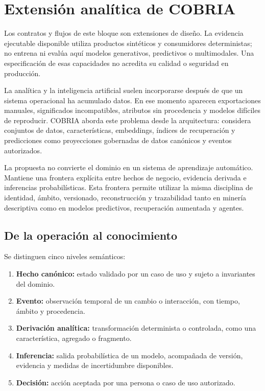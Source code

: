 \chapter{Extensión analítica de COBRIA}

Los contratos y flujos de este bloque son extensiones de diseño. La evidencia
ejecutable disponible utiliza productos sintéticos y consumidores deterministas;
no entrena ni evalúa aquí modelos generativos, predictivos o multimodales. Una
especificación de esas capacidades no acredita su calidad o seguridad en producción.

La analítica y la inteligencia artificial suelen incorporarse después de que un sistema
operacional ha acumulado datos. En ese momento aparecen exportaciones manuales,
significados incompatibles, atributos sin procedencia y modelos difíciles de reproducir.
COBRIA aborda este problema desde la arquitectura: considera conjuntos de datos, características,
embeddings, índices de recuperación y predicciones como proyecciones gobernadas de datos
canónicos y eventos autorizados.

La propuesta no convierte el dominio en un sistema de aprendizaje automático. Mantiene
una frontera explícita entre hechos de negocio, evidencia derivada e inferencias
probabilísticas. Esta frontera permite utilizar la misma disciplina de identidad, ámbito,
versionado, reconstrucción y trazabilidad tanto en minería descriptiva como en modelos
predictivos, recuperación aumentada y agentes.

\section{De la operación al conocimiento}

Se distinguen cinco niveles semánticos:

\begin{enumerate}[leftmargin=*]
  \item \textbf{Hecho canónico:} estado validado por un caso de uso y sujeto a
  invariantes del dominio.
  \item \textbf{Evento:} observación temporal de un cambio o interacción, con tiempo,
  ámbito y procedencia.
  \item \textbf{Derivación analítica:} transformación determinista o controlada, como
  una característica, agregado o fragmento.
  \item \textbf{Inferencia:} salida probabilística de un modelo, acompañada de versión,
  evidencia y medidas de incertidumbre disponibles.
  \item \textbf{Decisión:} acción aceptada por una persona o caso de uso autorizado.
\end{enumerate}

